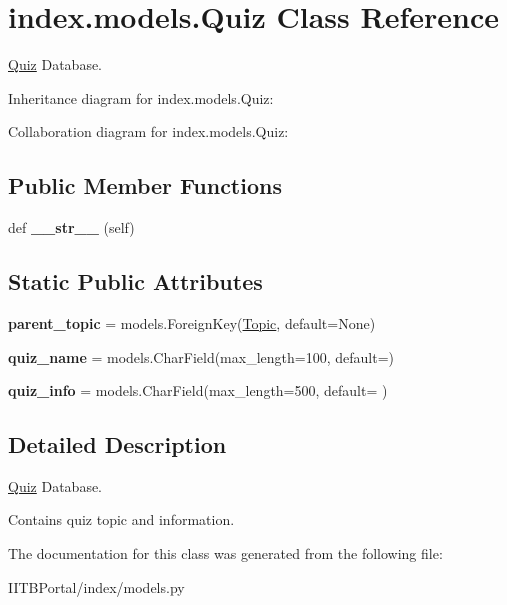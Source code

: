 \hypertarget{classindex_1_1models_1_1Quiz}{}\section{index.\+models.\+Quiz Class Reference}
\label{classindex_1_1models_1_1Quiz}


\hyperlink{classindex_1_1models_1_1Quiz}{Quiz} Database.  




Inheritance diagram for index.\+models.\+Quiz\+:


Collaboration diagram for index.\+models.\+Quiz\+:
\subsection*{Public Member Functions}
\begin{DoxyCompactItemize}
\item 
\mbox{\label{classindex_1_1models_1_1Quiz_ab270ee0cf0a5400181b635886e396029}} 
def {\bfseries \+\_\+\+\_\+str\+\_\+\+\_\+} (self)
\end{DoxyCompactItemize}
\subsection*{Static Public Attributes}
\begin{DoxyCompactItemize}
\item 
\mbox{\label{classindex_1_1models_1_1Quiz_a7c5c4580a072ede9148c949a6d87645c}} 
{\bfseries parent\+\_\+topic} = models.\+Foreign\+Key(\hyperlink{classindex_1_1models_1_1Topic}{Topic}, default=None)
\item 
\mbox{\label{classindex_1_1models_1_1Quiz_aefa7be0d645c45c418424873d0ca6746}} 
{\bfseries quiz\+\_\+name} = models.\+Char\+Field(max\+\_\+length=100, default=\textquotesingle{}\textquotesingle{})
\item 
\mbox{\label{classindex_1_1models_1_1Quiz_a51c527d32ec72effdf4f6d8773c7d47b}} 
{\bfseries quiz\+\_\+info} = models.\+Char\+Field(max\+\_\+length=500, default=\textquotesingle{}\textquotesingle{} )
\end{DoxyCompactItemize}


\subsection{Detailed Description}
\hyperlink{classindex_1_1models_1_1Quiz}{Quiz} Database. 

Contains quiz topic and information. 

The documentation for this class was generated from the following file\+:\begin{DoxyCompactItemize}
\item 
I\+I\+T\+B\+Portal/index/models.\+py\end{DoxyCompactItemize}

